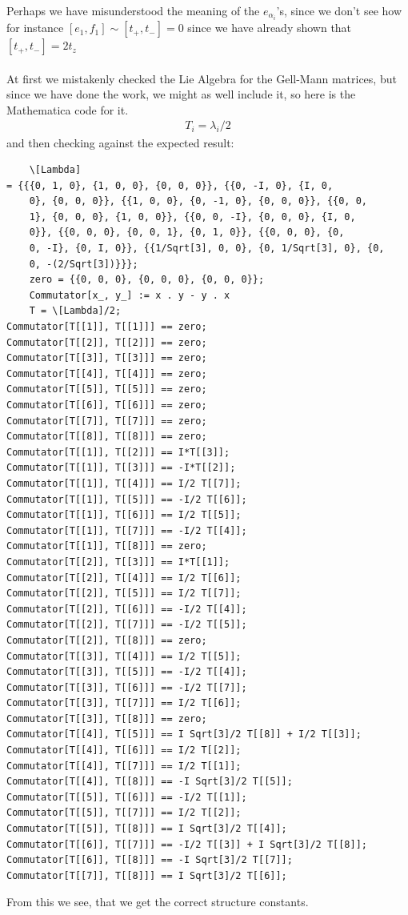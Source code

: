 \documentclass[a4paper,12pt]{article}
\begin{document}
Perhaps we have misunderstood the meaning of the $e_{\alpha_i}$'s, since we don't see how for instance $[e_1,f_1]\sim [t_+,t_-]=0$ since we have already shown that $[t_+,t_-]=2t_z$
\\\\
At first we mistakenly checked the Lie Algebra for the Gell-Mann matrices, but since we have done the work, we might as well include it, so here is the Mathematica code for it.
\begin{equation}
	\begin{aligned}
		T_i=\lambda_i/2
	\end{aligned}
\end{equation}
and then checking against the expected result:
\begin{lstlisting}
	\[Lambda] 
= {{{0, 1, 0}, {1, 0, 0}, {0, 0, 0}}, {{0, -I, 0}, {I, 0, 
	0}, {0, 0, 0}}, {{1, 0, 0}, {0, -1, 0}, {0, 0, 0}}, {{0, 0, 
	1}, {0, 0, 0}, {1, 0, 0}}, {{0, 0, -I}, {0, 0, 0}, {I, 0, 
	0}}, {{0, 0, 0}, {0, 0, 1}, {0, 1, 0}}, {{0, 0, 0}, {0, 
	0, -I}, {0, I, 0}}, {{1/Sqrt[3], 0, 0}, {0, 1/Sqrt[3], 0}, {0, 
	0, -(2/Sqrt[3])}}};
	zero = {{0, 0, 0}, {0, 0, 0}, {0, 0, 0}};
	Commutator[x_, y_] := x . y - y . x
	T = \[Lambda]/2;
Commutator[T[[1]], T[[1]]] == zero;
Commutator[T[[2]], T[[2]]] == zero;
Commutator[T[[3]], T[[3]]] == zero;
Commutator[T[[4]], T[[4]]] == zero;
Commutator[T[[5]], T[[5]]] == zero;
Commutator[T[[6]], T[[6]]] == zero;
Commutator[T[[7]], T[[7]]] == zero;
Commutator[T[[8]], T[[8]]] == zero;
Commutator[T[[1]], T[[2]]] == I*T[[3]];
Commutator[T[[1]], T[[3]]] == -I*T[[2]];
Commutator[T[[1]], T[[4]]] == I/2 T[[7]];
Commutator[T[[1]], T[[5]]] == -I/2 T[[6]];
Commutator[T[[1]], T[[6]]] == I/2 T[[5]];
Commutator[T[[1]], T[[7]]] == -I/2 T[[4]];
Commutator[T[[1]], T[[8]]] == zero;
Commutator[T[[2]], T[[3]]] == I*T[[1]];
Commutator[T[[2]], T[[4]]] == I/2 T[[6]];
Commutator[T[[2]], T[[5]]] == I/2 T[[7]];
Commutator[T[[2]], T[[6]]] == -I/2 T[[4]];
Commutator[T[[2]], T[[7]]] == -I/2 T[[5]];
Commutator[T[[2]], T[[8]]] == zero;
Commutator[T[[3]], T[[4]]] == I/2 T[[5]];
Commutator[T[[3]], T[[5]]] == -I/2 T[[4]];
Commutator[T[[3]], T[[6]]] == -I/2 T[[7]];
Commutator[T[[3]], T[[7]]] == I/2 T[[6]];
Commutator[T[[3]], T[[8]]] == zero;
Commutator[T[[4]], T[[5]]] == I Sqrt[3]/2 T[[8]] + I/2 T[[3]];
Commutator[T[[4]], T[[6]]] == I/2 T[[2]];
Commutator[T[[4]], T[[7]]] == I/2 T[[1]];
Commutator[T[[4]], T[[8]]] == -I Sqrt[3]/2 T[[5]];
Commutator[T[[5]], T[[6]]] == -I/2 T[[1]];
Commutator[T[[5]], T[[7]]] == I/2 T[[2]];
Commutator[T[[5]], T[[8]]] == I Sqrt[3]/2 T[[4]];
Commutator[T[[6]], T[[7]]] == -I/2 T[[3]] + I Sqrt[3]/2 T[[8]];
Commutator[T[[6]], T[[8]]] == -I Sqrt[3]/2 T[[7]];
Commutator[T[[7]], T[[8]]] == I Sqrt[3]/2 T[[6]];
\end{lstlisting}
From this we see, that we get the correct structure constants.
\newpage
\end{document}

